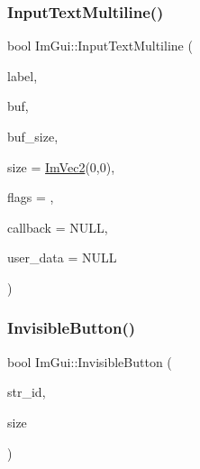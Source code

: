 \mbox{\label{namespace_im_gui_a94b4d241eafa1a4a077f98f5aee00dda}} 
\subsubsection{\texorpdfstring{Input\+Text\+Multiline()}{InputTextMultiline()}}
{\footnotesize\ttfamily bool Im\+Gui\+::\+Input\+Text\+Multiline (\begin{DoxyParamCaption}\item[{const char $\ast$}]{label,  }\item[{char $\ast$}]{buf,  }\item[{size\+\_\+t}]{buf\+\_\+size,  }\item[{const \mbox{\hyperlink{struct_im_vec2}{Im\+Vec2}} \&}]{size = {\ttfamily \mbox{\hyperlink{struct_im_vec2}{Im\+Vec2}}(0,0)},  }\item[{\mbox{\hyperlink{imgui_8h_a7d2c6153a6b9b5d3178ce82434ac9fb8}{Im\+Gui\+Input\+Text\+Flags}}}]{flags = {},  }\item[{\mbox{\hyperlink{imgui_8h_ae9254e6ad76a9bc7abc20929e07b29c5}{Im\+Gui\+Text\+Edit\+Callback}}}]{callback = {\ttfamily NULL},  }\item[{void $\ast$}]{user\+\_\+data = {\ttfamily NULL} }\end{DoxyParamCaption})}

\mbox{\label{namespace_im_gui_a22668d440cbbb1f8be07241d9c6d9096}} 
\subsubsection{\texorpdfstring{Invisible\+Button()}{InvisibleButton()}}
{\footnotesize\ttfamily bool Im\+Gui\+::\+Invisible\+Button (\begin{DoxyParamCaption}\item[{const char $\ast$}]{str\+\_\+id,  }\item[{const \mbox{\hyperlink{struct_im_vec2}{Im\+Vec2}} \&}]{size }\end{DoxyParamCaption})}

\mbox{\label{namespace_im_gui_acdc18199d50d26919312db5f9707b8dc}} 
